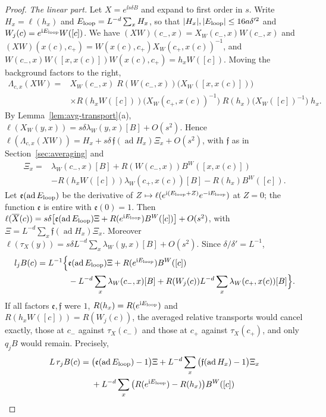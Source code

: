 \begin{proof}
\emph{The linear part.} Let $X=e^{\ii s\delta B}$ and expand to first order in $s$. Write $H_x=\ell(h_x)$ and $E_{\rm loop}=L^{-d}\sum_xH_x$, so that $|H_x|,|E_{\rm loop}|\le16a\delta'^2$ and $W_j(c)=e^{\mathrm i E_{\rm loop}}W([c])$. We have $(XW)(c_-,x)=X_W(c_-,x)W(c_-,x)$ and $(XW)(x(c),c_+)=W(x(c),c_+)X_W(c_+,x(c))^{-1}$, and $W(c_-,x)W([x,x(c)])W(x(c),c_+)=h_xW([c])$. Moving the background factors to the right,
\[
\begin{aligned}
\Lambda_{c,x}(XW)={}&X_W(c_-,x)\;R(W(c_-,x))\big(X_W([x,x(c)])\big)\\
&\times R(h_xW([c]))\big(X_W(c_+,x(c))^{-1}\big)\;R(h_x)\big(X_W([c])^{-1}\big)\;h_x .
\end{aligned}
\]
By Lemma~\ref{lem:avg-transport}(a), $\ell(X_W(y,x))=s\delta\lambda_W(y,x)[B]+O(s^2)$. Hence $\ell(\Lambda_{c,x}(XW))=H_x+s\delta\,\mathfrak f(\operatorname{ad}H_x)\Xi_x+O(s^2)$, with $\mathfrak f$ as in Section~\ref{sec:averaging} and
\[
\begin{aligned}
\Xi_x={}&\lambda_W(c_-,x)[B]+R(W(c_-,x))B^W([x,x(c)])\\
&-R(h_xW([c]))\lambda_W(c_+,x(c))[B]-R(h_x)B^W([c]).
\end{aligned}
\]
Let $\mathfrak e(\operatorname{ad}E_{\rm loop})$ be the derivative of $Z\mapsto\ell(e^{\mathrm i(E_{\rm loop}+Z)}e^{-\mathrm i E_{\rm loop}})$ at $Z=0$; the function $\mathfrak e$ is entire with $\mathfrak e(0)=1$. Then $\ell(\overline X(c))=s\delta\big[\mathfrak e(\operatorname{ad}E_{\rm loop})\Xi+R(e^{\mathrm i E_{\rm loop}})B^W([c])\big]+O(s^2)$, with $\Xi=L^{-d}\sum_x\mathfrak f(\operatorname{ad}H_x)\Xi_x$. Moreover $\ell(\tau_X(y))=s\delta L^{-d}\sum_x\lambda_W(y,x)[B]+O(s^2)$. Since $\delta/\delta'=L^{-1}$,
\[
\begin{aligned}
l_jB(c)=L^{-1}\Big\{&\mathfrak e(\operatorname{ad}E_{\rm loop})\Xi+R(e^{\mathrm i E_{\rm loop}})B^W([c])\\
&-L^{-d}\sum_x\lambda_W(c_-,x)[B]+R(W_j(c))L^{-d}\sum_{x}\lambda_W(c_+,x(c))[B]\Big\}.
\end{aligned}
\]
If all factors $\mathfrak e,\mathfrak f$ were $1$, $R(h_x)=R(e^{\mathrm i E_{\rm loop}})$ and $R(h_xW([c]))=R(W_j(c))$, the averaged relative transports would cancel exactly, those at $c_-$ against $\tau_X(c_-)$ and those at $c_+$ against $\tau_X(c_+)$, and only $q_jB$ would remain. Precisely,
\[
\begin{aligned}
L\,r_jB(c)={}&\big(\mathfrak e(\operatorname{ad}\Eloop)-1\big)\Xi+L^{-d}\sum_x\big(\mathfrak f(\operatorname{ad}H_x)-1\big)\Xi_x\\&+L^{-d}\sum_x\big(R(e^{\ii \Eloop})-R(h_x)\big)B^W([c])\\

\end{aligned}\]
\end{proof}
